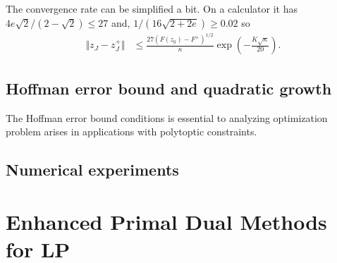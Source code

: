 \documentclass[12pt]{report}
\begin{document}
        \begin{remark}
            The convergence rate can be simplified a bit. 
            On a calculator it has $4e\sqrt{2}/(2 - \sqrt{2}) \le 27$ and, $1/(16\sqrt{2 + 2e}) \ge 0.02$ so 
            \begin{align*}
                \Vert z_J - z_J^+\Vert &\le \frac{27(F(z_0) - F^+)^{1/2}}{\kappa}\exp\left(
                    - \frac{K\sqrt{\kappa}}{20}
                \right). 
            \end{align*}
        \end{remark}
    
    \section{Hoffman error bound and quadratic growth}
        The Hoffman error bound conditions is essential to analyzing optimization problem arises in applications with polytoptic constraints. 
        
    \section{Numerical experiments}
    
    
    
\chapter{Enhanced Primal Dual Methods for LP}
    






\end{document}
